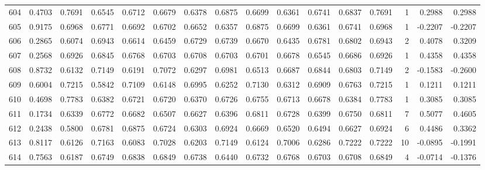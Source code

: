 \begin{tabular}{lrrrrrrrrrrrrrrr}
604 &      0.4703 &  0.7691 &  0.6545 &  0.6712 &  0.6679 &  0.6378 &  0.6875 &  0.6699 &  0.6361 &  0.6741 &   0.6837 &     0.7691 &      1 &                    0.2988 &                     0.2988 \\
605 &      0.9175 &  0.6968 &  0.6771 &  0.6692 &  0.6702 &  0.6652 &  0.6357 &  0.6875 &  0.6699 &  0.6361 &   0.6741 &     0.6968 &      1 &                   -0.2207 &                    -0.2207 \\
606 &      0.2865 &  0.6074 &  0.6943 &  0.6614 &  0.6459 &  0.6729 &  0.6739 &  0.6670 &  0.6435 &  0.6781 &   0.6802 &     0.6943 &      2 &                    0.4078 &                     0.3209 \\
607 &      0.2568 &  0.6926 &  0.6845 &  0.6768 &  0.6703 &  0.6708 &  0.6703 &  0.6701 &  0.6678 &  0.6545 &   0.6686 &     0.6926 &      1 &                    0.4358 &                     0.4358 \\
608 &      0.8732 &  0.6132 &  0.7149 &  0.6191 &  0.7072 &  0.6297 &  0.6981 &  0.6513 &  0.6687 &  0.6844 &   0.6803 &     0.7149 &      2 &                   -0.1583 &                    -0.2600 \\
609 &      0.6004 &  0.7215 &  0.5842 &  0.7109 &  0.6148 &  0.6995 &  0.6252 &  0.7130 &  0.6312 &  0.6909 &   0.6763 &     0.7215 &      1 &                    0.1211 &                     0.1211 \\
610 &      0.4698 &  0.7783 &  0.6382 &  0.6721 &  0.6720 &  0.6370 &  0.6726 &  0.6755 &  0.6713 &  0.6678 &   0.6384 &     0.7783 &      1 &                    0.3085 &                     0.3085 \\
611 &      0.1734 &  0.6339 &  0.6772 &  0.6682 &  0.6507 &  0.6627 &  0.6396 &  0.6811 &  0.6728 &  0.6399 &   0.6750 &     0.6811 &      7 &                    0.5077 &                     0.4605 \\
612 &      0.2438 &  0.5800 &  0.6781 &  0.6875 &  0.6724 &  0.6303 &  0.6924 &  0.6669 &  0.6520 &  0.6494 &   0.6627 &     0.6924 &      6 &                    0.4486 &                     0.3362 \\
613 &      0.8117 &  0.6126 &  0.7163 &  0.6083 &  0.7028 &  0.6203 &  0.7149 &  0.6124 &  0.7006 &  0.6286 &   0.7222 &     0.7222 &     10 &                   -0.0895 &                    -0.1991 \\
614 &      0.7563 &  0.6187 &  0.6749 &  0.6838 &  0.6849 &  0.6738 &  0.6440 &  0.6732 &  0.6768 &  0.6703 &   0.6708 &     0.6849 &      4 &                   -0.0714 &                    -0.1376 \\

\end{tabular}
